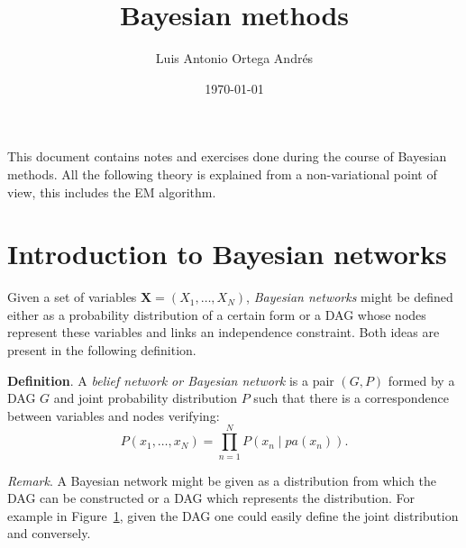 \documentclass[11pt]{article}
\author{Luis Antonio Ortega Andrés}
\date{\today}
\title{Bayesian methods}
\theoremstyle{definition}
\begin{document}
\maketitle

This document contains notes and exercises done during the course of Bayesian methods. All the following theory is explained from a non-variational point of view, this includes the EM algorithm.

\section{Introduction to Bayesian networks}

Given a set of variables \(\bm{X} = (X_{1},\dots,X_{N})\), \emph{Bayesian networks} might be defined either as a probability distribution of a certain form or a DAG whose nodes represent these variables and links an independence constraint. Both ideas are present in the following definition.

\textbf{Definition}. A \emph{belief network or Bayesian network} is a pair \((G,P)\) formed by a DAG \(G\) and  joint probability distribution \(P\) such that there is a correspondence between variables and nodes verifying:
  \[
    P(x_{1},\dots,x_{N}) = \prod_{n=1}^{N}P(x_{n}\mid pa(x_{n})).
  \]

\textit{Remark}. A Bayesian network might be given as a distribution from which the DAG can be constructed or a DAG which represents the distribution. For example in Figure~\ref{fig:bn_example}, given the DAG one could easily define the joint distribution and conversely.


\begin{figure}[h!]
  \centering
    \label{fig:bn_example}
\end{figure}
\end{document}
